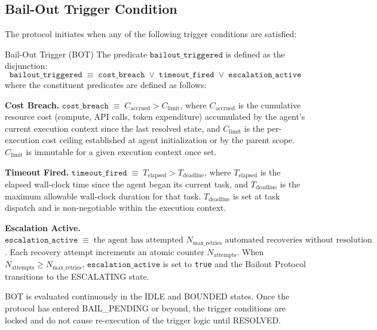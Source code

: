 \bigskip

\subsection{Bail-Out Trigger Condition}

The protocol initiates when any of the following trigger conditions are satisfied:

\begin{definition}{Bail-Out Trigger (BOT)}
The predicate $\texttt{bailout\_triggered}$ is defined as the disjunction:
\[
\texttt{bailout\_triggered} \;\equiv\; \texttt{cost\_breach} \;\lor\; \texttt{timeout\_fired} \;\lor\; \texttt{escalation\_active}
\]
where the constituent predicates are defined as follows:
\end{definition}

\medskip

\noindent\textbf{Cost Breach.} $\texttt{cost\_breach} \;\equiv\; C_\text{accrued} > C_\text{limit}$, where $C_\text{accrued}$ is the cumulative resource cost (compute, API calls, token expenditure) accumulated by the agent's current execution context since the last resolved state, and $C_\text{limit}$ is the per-execution cost ceiling established at agent initialization or by the parent scope. $C_\text{limit}$ is immutable for a given execution context once set.

\medskip

\noindent\textbf{Timeout Fired.} $\texttt{timeout\_fired} \;\equiv\; T_\text{elapsed} > T_\text{deadline}$, where $T_\text{elapsed}$ is the elapsed wall-clock time since the agent began its current task, and $T_\text{deadline}$ is the maximum allowable wall-clock duration for that task. $T_\text{deadline}$ is set at task dispatch and is non-negotiable within the execution context.

\medskip

\noindent\textbf{Escalation Active.} $\texttt{escalation\_active} \;\equiv\; \text{the agent has attempted } N_\text{max\_retries} \text{ automated recoveries without resolution}$. Each recovery attempt increments an atomic counter $N_\text{attempts}$. When $N_\text{attempts} \geq N_\text{max\_retries}$, $\texttt{escalation\_active}$ is set to \texttt{true} and the Bailout Protocol transitions to the ESCALATING state.

\begin{note}
BOT is evaluated continuously in the IDLE and BOUNDED states. Once the protocol has entered BAIL\_PENDING or beyond, the trigger conditions are locked and do not cause re-execution of the trigger logic until RESOLVED.
\end{note}

